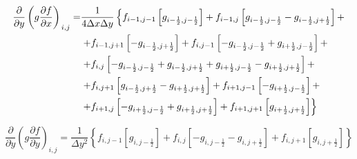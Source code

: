 \documentclass[12pt, a4paper]{article}
\newcommand\onehalf{\frac{1}{2}} %
\begin{document}
\begin{equation*}
    \begin{split}
	    \left.
	        \frac
                {\partial }
                {\partial y}
	        \left(
	            g
	            \frac
	                {\partial f}
	                {\partial x}
	        \right)
        \right._{i, j}
	    = &
	    \frac
	        {1}
	        {4 \Delta x \Delta y}
	    \left\{
	        f_{i - 1, j - 1}
	        \left[
                g_{i - \onehalf, j - \onehalf}
            \right]
	        +
	        f_{i - 1, j}
	       \left[
	        	g_{i - \onehalf, j - \onehalf}
	        	- g_{i - \onehalf, j + \onehalf}
	        \right]
	        +
        \right.
        \\ &
        \left.
            +
            \newline
	        f_{i - 1, j + 1}
	        \left[
                - g_{i - \onehalf, j + \onehalf}
            \right]
	        +
	        f_{i, j-1}
	        \left[
                - g_{i - \onehalf, j - \onehalf}
                + g_{i + \onehalf, j - \onehalf}
	    	\right]
            +
        \right.
        \\ &
        \left.
            +
            f_{i, j}
	        \left[
                - g_{i - \onehalf, j - \onehalf}
                + g_{i - \onehalf, j + \onehalf}
                + g_{i + \onehalf, j - \onehalf}
                - g_{i + \onehalf, j + \onehalf}
            \right]
            +
        \right. 
        \\ &
        \left.
            +
            f_{i, j + 1}
            \left[
                  g_{i - \onehalf, j + \onehalf}
                - g_{i + \onehalf, j + \onehalf}
            \right]
            +
            f_{i + 1, j - 1}
            \left[
                - g_{i + \onehalf, j - \onehalf}
            \right]
            +
        \right.
        \\ &
        \left.
            +
            f_{i + 1, j}
            \left[
                - g_{i + \onehalf, j - \onehalf}
                + g_{i + \onehalf, j + \onehalf}
            \right]
            +
            f_{i + 1, j + 1}
            \left[
                  g_{i + \onehalf, j + \onehalf}
            \right]
        \right\}
    \end{split}
\end{equation*}

\begin{equation*}
	\left.
        \frac
	        {\partial }
	        {\partial y}
	    \left(
	        g
	    	\frac
	    	    {\partial f}
	    	    {\partial y}
	    \right)
	\right._{i, j}
	=
	\frac
	    {1}
	    {\Delta y^2}
	\left\{
	    f_{i, j - 1}
	    \left[
		    g_{i, j - \onehalf}
		\right]
	    +
	    f_{i,j}
	    \left[
		    - g_{i, j - \onehalf}
		    - g_{i, j + \onehalf}
	    \right]
	    +
	    f_{i,j + 1}
	    \left[
		    g_{i, j + \onehalf}
	    \right]
	\right\}
\end{equation*}
\end{document}

